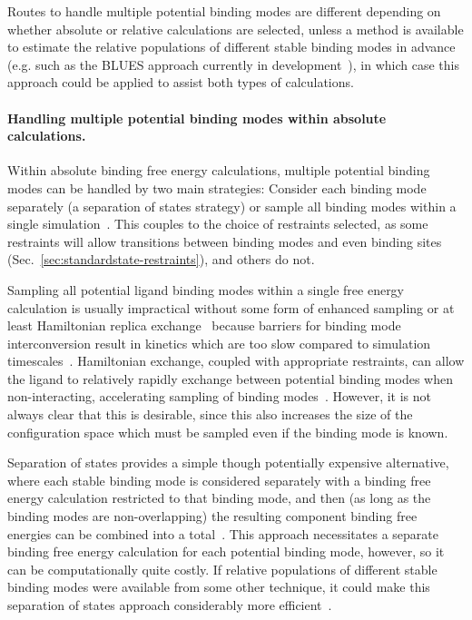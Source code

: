 \documentclass[9pt,bestpractices]{livecoms}
\begin{document}
Routes to handle multiple potential binding modes are different depending on whether absolute or relative calculations are selected, unless a method is available to estimate the relative populations of different stable binding modes in advance (e.g. such as the BLUES approach currently in development~\cite{gill2018binding}), in which case this approach could be applied to assist both types of calculations.

\paragraph{Handling multiple potential binding modes within absolute calculations.}
Within absolute binding free energy calculations, multiple potential binding modes can be handled by two main strategies: Consider each binding mode separately (a separation of states strategy) or sample all binding modes within a single simulation~\cite{mobley2012perspective}.
This couples to the choice of restraints selected, as some restraints will allow transitions between binding modes and even binding sites (Sec.~\ref{sec:standardstate-restraints}), and others do not.

Sampling all potential ligand binding modes within a single free energy calculation is usually impractical without some form of enhanced sampling or at least Hamiltonian replica exchange~\cite{wang2013identifying} because barriers for binding mode interconversion result in kinetics which are too slow compared to simulation timescales~\cite{mobley2006use, palma2012computation,mobley2012perspective, gill2018binding}.
Hamiltonian exchange, coupled with appropriate restraints, can allow the ligand to relatively rapidly exchange between potential binding modes when non-interacting, accelerating sampling of binding modes~\cite{wang2013identifying}. However, it is not always clear that this is desirable, since this also increases the size of the configuration space which must be sampled even if the binding mode is known.

Separation of states provides a simple though potentially expensive alternative, where each stable binding mode is considered separately with a binding free energy calculation restricted to that binding mode, and then (as long as the binding modes are non-overlapping) the resulting component binding free energies can be combined into a total~\cite{mobley2006use, mobley2012perspective}.
This approach necessitates a separate binding free energy calculation for each potential binding mode, however, so it can be computationally quite costly.
If relative populations of different stable binding modes were available from some other technique, it could make this separation of states approach considerably more efficient~\cite{mobley2012perspective, gill2018binding}.
\end{document}
